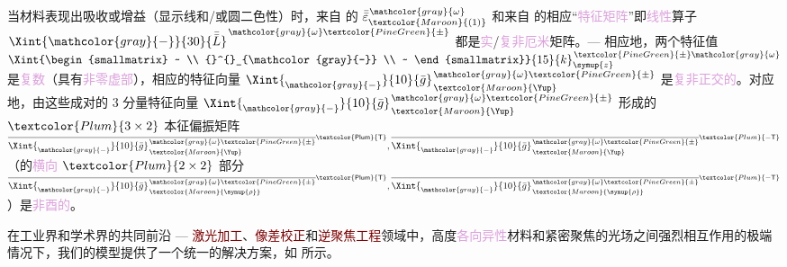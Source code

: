 当材料表现出\textcolor{NavyBlue}{吸收}或\textcolor{NavyBlue}{增益}（显示\textcolor{NavyBlue}{线}和/或\textcolor{NavyBlue}{圆二色性}）时，来自  的 $\bar{\bar{\varepsilon}}^{\;\! \mathcolor{gray}{\omega}}_{\textcolor{Maroon}{(1)}}$ 和来自  的相应“\textcolor{Plum}{特征矩阵}”即\textcolor{Plum}{线性}算子 $\Xint{\mathcolor{gray}{-}}{30}{\bar{\bar{L}}}^{\;\! \mathcolor{gray}{\omega} \textcolor{PineGreen}{\pm}}$ 都是\textcolor{Plum}{实}/\textcolor{Plum}{复非厄米}矩阵。--- 相应地，两个\textcolor{PineGreen}{特征值} $\Xint{\begin{smallmatrix} ~ \\ {}^{}_{\mathcolor{gray}{-}} \\ ~ \end{smallmatrix}}{15}{k}_{\symup{z} }^{\;\! \textcolor{PineGreen}{\pm} \mathcolor{gray}{\omega}}$ 是\textcolor{Plum}{复数}（具有\textcolor{Plum}{非零虚部}），相应的\textcolor{PineGreen}{特征向量} $\Xint{{}^{}_{\mathcolor{gray}{-}}}{10}{\bar{g}}^{\;\!\mathcolor{gray}{\omega} \textcolor{PineGreen}{\pm}}_{\;\! \textcolor{Maroon}{\Yup}}$ 是\textcolor{Plum}{复非正交的}。对应地，由这些成对的 3 分量\textcolor{PineGreen}{特征向量} $\Xint{{}^{}_{\mathcolor{gray}{-}}}{10}{\bar{g}}^{\;\!\mathcolor{gray}{\omega} \textcolor{PineGreen}{\pm}}_{\;\! \textcolor{Maroon}{\Yup}}$ 形成的 $\textcolor{Plum}{3 \times 2}$ \textcolor{PineGreen}{本征偏振矩阵} $\overline{\Xint{{}^{}_{\mathcolor{gray}{-}}}{10}{\bar{g}}^{\;\!\mathcolor{gray}{\omega} \textcolor{PineGreen}{\pm}}_{\;\! \textcolor{Maroon}{\Yup}}}^{\mathsf{\textcolor{Plum}{T}}}, \overline{\Xint{{}^{}_{\mathcolor{gray}{-}}}{10}{\bar{g}}^{\;\!\mathcolor{gray}{\omega} \textcolor{PineGreen}{\pm}}_{\;\! \textcolor{Maroon}{\Yup}}}^{\textcolor{Plum}{-\mathsf{T}}}$（的\textcolor{Plum}{横向} $\textcolor{Plum}{2 \times 2}$ 部分 $\overline{\Xint{{}^{}_{\mathcolor{gray}{-}}}{10}{\bar{g}}^{\;\!\mathcolor{gray}{\omega} \textcolor{PineGreen}{\pm}}_{\;\! \textcolor{Maroon}{\symup{\rho}}}}^{\mathsf{\textcolor{Plum}{T}}}, \overline{\Xint{{}^{}_{\mathcolor{gray}{-}}}{10}{\bar{g}}^{\;\!\mathcolor{gray}{\omega} \textcolor{PineGreen}{\pm}}_{\;\! \textcolor{Maroon}{\symup{\rho}}}}^{\textcolor{Plum}{-\mathsf{T}}}$）是\textcolor{Plum}{非酉的}。

在工业界和学术界的共同前沿 --- \textcolor{Maroon}{激光加工}、\textcolor{Maroon}{像差校正}和\textcolor{Maroon}{逆聚焦工程}领域中，高度\textcolor{Plum}{各向异性}材料和\textcolor{PineGreen}{紧密聚焦}的光场之间强烈相互作用的极端情况下，我们的模型提供了一个统一的解决方案，如  所示。

